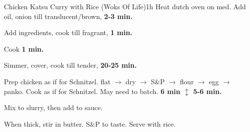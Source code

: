 \documentclass[a6paper,landscape]{article}
\begin{document}
\begin{recipe}{Chicken Katsu Curry with Rice       (Woks Of Life)}{1h}{}
  Heat dutch oven on med. Add oil, onion till translucent/brown, \bf{2-3 min}.

  Add ingredients, cook till fragrant, \bf{1 min}.

  Cook \bf{1 min}.

  Simmer, cover, cook till tender, \bf{20-25 min}.

  Prep chicken as if for Schnitzel. \newline flat $\rightarrow$ dry $\rightarrow$ S\&P $\rightarrow$ flour $\rightarrow$ egg $\rightarrow$ panko.
  \newline Cook as if for Schnitzel. May need to batch. \bf{6 min} $\updownarrow$ \bf{5-6 min}.

  Mix to slurry, then add to sauce. 

  When thick, stir in butter. S\&P to taste.
  \newstep Serve with rice.
  \end{recipe}
\end{document}
